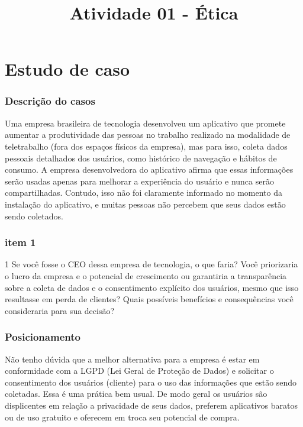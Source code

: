 


\title{Atividade 01 - Ética}

\def\autor{Oscar Sérgio Monteiro\\
\texttt{oscar.monteiro@ufpr.br}}

\def\disciplina{SC325 - Ética Geral e Profissional, turma a}
\def\professor{Edicreia Santos}




\chapter{Estudo de caso}
\subsection{Descrição do casos}
Uma empresa brasileira de tecnologia desenvolveu um aplicativo que promete aumentar a produtividade das pessoas no trabalho realizado na modalidade de teletrabalho (fora dos espaços físicos da empresa), mas para isso, coleta dados pessoais detalhados dos usuários, como histórico de navegação e hábitos de consumo. A empresa desenvolvedora do aplicativo afirma que essas informações serão usadas apenas para melhorar a experiência do usuário e nunca serão compartilhadas. Contudo, isso não foi claramente informado no momento da instalação do aplicativo, e muitas pessoas não percebem que seus dados estão sendo coletados.\\

\subsection{item 1}
1 Se você fosse o CEO dessa empresa de tecnologia, o que faria? Você priorizaria o lucro da empresa e o potencial de crescimento ou garantiria a transparência sobre a coleta de dados e o consentimento explícito dos usuários, mesmo que isso resultasse em perda de clientes? Quais possíveis benefícios e consequências você consideraria para sua decisão?\\
\subsection{Posicionamento}
Não tenho dúvida que a melhor alternativa para a empresa é estar em conformidade com a LGPD (Lei Geral de Proteção de Dados) e solicitar o consentimento dos usuários (cliente) para o uso das informações que estão sendo coletadas. Essa é uma prática bem usual. De modo geral os usuários são displicentes em relação a privacidade de seus dados, preferem aplicativos baratos ou de uso gratuito e oferecem em troca seu potencial de compra.\\
